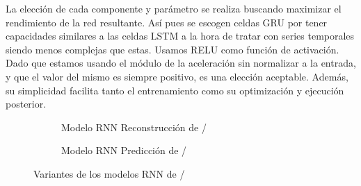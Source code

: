 La elección de cada componente y parámetro se realiza buscando maximizar el rendimiento de la red resultante. Así pues se escogen celdas GRU por tener capacidades similares a las celdas LSTM a la hora de tratar con series temporales \cite{Chung2014} siendo menos complejas que estas. Usamos RELU como función de activación. Dado que estamos usando el módulo de la aceleración sin normalizar a la entrada, y que el valor del mismo es siempre positivo, es una elección aceptable. Además, su simplicidad facilita tanto el entrenamiento como su optimización y ejecución posterior.

\begin{figure}[!ht]
  \centering
  \begin{subfigure}[b]{0.48\textwidth}
      \centering
      \caption{\label{fig:modelo:rnnFinal:recon}Modelo RNN Reconstrucción de \ifell/}
  \end{subfigure}
  \hfill
  \begin{subfigure}[b]{0.48\textwidth}
      \centering
      \caption{\label{fig:modelo:rnnFinal:predict}Modelo RNN Predicción de \ifell/}
  \end{subfigure}
  \caption{\label{fig:rnnFinal} Variantes de los modelos RNN de \ifell/}
\end{figure}


